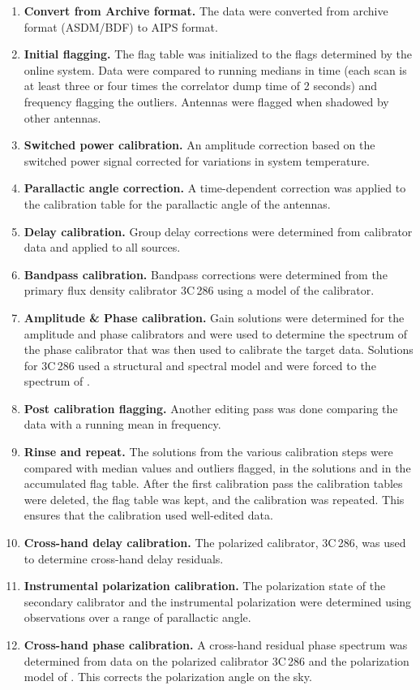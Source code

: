\documentclass{aa}
\begin{document}
\begin{enumerate}
\item{\bf Convert from Archive format.}
The data were converted from archive format (ASDM/BDF) to AIPS format.
\item{\bf Initial flagging.}
The flag table was initialized to the flags determined by the online system. Data were compared to running medians in time (each scan is at least three or four times the correlator dump time of 2 seconds) and frequency flagging the outliers. 
Antennas were flagged when shadowed by other antennas.
\item{\bf Switched power calibration.}
An amplitude correction based on the switched power signal corrected for variations in system temperature.
\item{\bf Parallactic angle correction.}
A time-dependent correction was applied to the calibration table for the parallactic angle of the antennas.
\item{\bf Delay calibration.}
Group delay corrections were determined from calibrator data and applied to all sources.
\item{\bf Bandpass calibration.}
Bandpass corrections were determined from the primary flux density calibrator 3C\,286 using a model of the calibrator.
\item{\bf Amplitude \& Phase calibration.}
Gain solutions were determined for the amplitude and phase
calibrators and were used to determine the spectrum of the phase calibrator that was then used to calibrate the target data. Solutions for 3C\,286 used a structural and spectral model and were forced to the spectrum of \cite{PerleyButler2013a}.
\item{\bf Post calibration flagging.}
Another editing pass was done comparing the data with a running mean in frequency.
\item{\bf Rinse and repeat.}
The solutions from the various calibration steps were compared with median values and outliers flagged,  in the solutions and in the accumulated flag table. After the first calibration pass the calibration tables were deleted, the flag table was kept, and the calibration was repeated. 
This ensures that the calibration used well-edited data.
\item{\bf Cross-hand delay calibration.}
The polarized calibrator, 3C\,286, was used to determine
cross-hand delay residuals.
\item{\bf Instrumental polarization calibration.}
The polarization state of the secondary calibrator and the
instrumental polarization were determined using observations over a range of parallactic angle.
\item{\bf Cross-hand phase calibration.}
A cross-hand residual phase spectrum was determined from data on the polarized calibrator 3C\,286 and the polarization model of
\cite{PerleyButler2013b}.
This corrects the polarization angle on the sky.
\end{enumerate}
\end{document}

